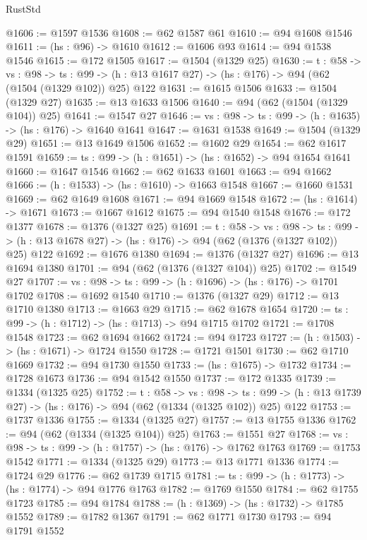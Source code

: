 \begin{lexlean}{RustStd}
\begin{coremodule}
{\begin{coremodule}
{{{{@1606 := @1597 @1536
@1608 := @62 @1587 @61
@1610 := @94 @1608 @1546
@1611 := (hs : @96) -> @1610
@1612 := @1606 @93
@1614 := @94 @1538 @1546
@1615 := @172 @1505
@1617 := @1504 (@1329 @25)
@1630 := {t : @58} ->
  {vs : @98} ->
  {ts : @99} -> (h : @13 @1617 @27) -> (hs : @176) -> @94 (@62 (@1504 (@1329 @102)) @25) @122
@1631 := @1615 @1506
@1633 := @1504 (@1329 @27)
@1635 := @13 @1633 @1506
@1640 := @94 (@62 (@1504 (@1329 @104)) @25)
@1641 := @1547 @27
@1646 := {vs : @98} -> {ts : @99} -> (h : @1635) -> (hs : @176) -> @1640 @1641
@1647 := @1631 @1538
@1649 := @1504 (@1329 @29)
@1651 := @13 @1649 @1506
@1652 := @1602 @29
@1654 := @62 @1617 @1591
@1659 := {ts : @99} -> (h : @1651) -> (hs : @1652) -> @94 @1654 @1641
@1660 := @1647 @1546
@1662 := @62 @1633 @1601
@1663 := @94 @1662
@1666 := (h : @1533) -> (hs : @1610) -> @1663 @1548
@1667 := @1660 @1531
@1669 := @62 @1649 @1608
@1671 := @94 @1669 @1548
@1672 := (hs : @1614) -> @1671
@1673 := @1667 @1612
@1675 := @94 @1540 @1548
@1676 := @172 @1377
@1678 := @1376 (@1327 @25)
@1691 := {t : @58} ->
  {vs : @98} ->
  {ts : @99} -> (h : @13 @1678 @27) -> (hs : @176) -> @94 (@62 (@1376 (@1327 @102)) @25) @122
@1692 := @1676 @1380
@1694 := @1376 (@1327 @27)
@1696 := @13 @1694 @1380
@1701 := @94 (@62 (@1376 (@1327 @104)) @25)
@1702 := @1549 @27
@1707 := {vs : @98} -> {ts : @99} -> (h : @1696) -> (hs : @176) -> @1701 @1702
@1708 := @1692 @1540
@1710 := @1376 (@1327 @29)
@1712 := @13 @1710 @1380
@1713 := @1663 @29
@1715 := @62 @1678 @1654
@1720 := {ts : @99} -> (h : @1712) -> (hs : @1713) -> @94 @1715 @1702
@1721 := @1708 @1548
@1723 := @62 @1694 @1662
@1724 := @94 @1723
@1727 := (h : @1503) -> (hs : @1671) -> @1724 @1550
@1728 := @1721 @1501
@1730 := @62 @1710 @1669
@1732 := @94 @1730 @1550
@1733 := (hs : @1675) -> @1732
@1734 := @1728 @1673
@1736 := @94 @1542 @1550
@1737 := @172 @1335
@1739 := @1334 (@1325 @25)
@1752 := {t : @58} ->
  {vs : @98} ->
  {ts : @99} -> (h : @13 @1739 @27) -> (hs : @176) -> @94 (@62 (@1334 (@1325 @102)) @25) @122
@1753 := @1737 @1336
@1755 := @1334 (@1325 @27)
@1757 := @13 @1755 @1336
@1762 := @94 (@62 (@1334 (@1325 @104)) @25)
@1763 := @1551 @27
@1768 := {vs : @98} -> {ts : @99} -> (h : @1757) -> (hs : @176) -> @1762 @1763
@1769 := @1753 @1542
@1771 := @1334 (@1325 @29)
@1773 := @13 @1771 @1336
@1774 := @1724 @29
@1776 := @62 @1739 @1715
@1781 := {ts : @99} -> (h : @1773) -> (hs : @1774) -> @94 @1776 @1763
@1782 := @1769 @1550
@1784 := @62 @1755 @1723
@1785 := @94 @1784
@1788 := (h : @1369) -> (hs : @1732) -> @1785 @1552
@1789 := @1782 @1367
@1791 := @62 @1771 @1730
@1793 := @94 @1791 @1552
}}}}
\end{coremodule}}
\end{coremodule}
\end{lexlean}

